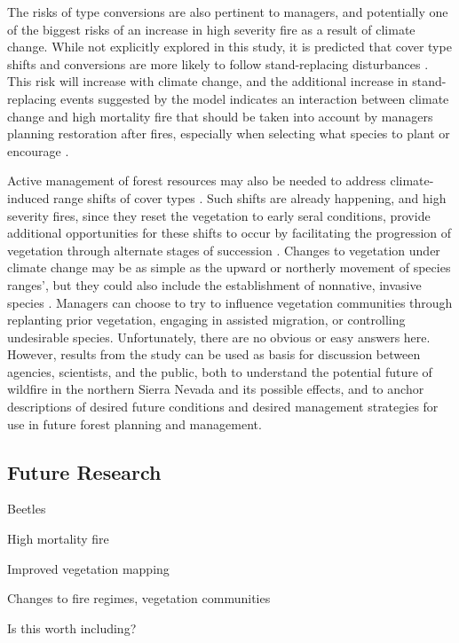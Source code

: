 The risks of type conversions are also pertinent to managers, and potentially one of the biggest risks of an increase in high severity fire as a result of climate change. While not explicitly explored in this study, it is predicted that cover type shifts and conversions are more likely to follow stand-replacing disturbances \citep{Stephens2013}. This risk will increase with climate change, and the additional increase in stand-replacing events suggested by the model indicates an interaction between climate change and high mortality fire that should be taken into account by managers planning restoration after fires, especially when selecting what species to plant or encourage \citep{Fule2008,Schwartz2015}. 

Active management of forest resources may also be needed to address climate-induced range shifts of cover types \citep{Keane2009}. Such shifts are already happening, and high severity fires, since they reset the vegetation to early seral conditions, provide additional opportunities for these shifts to occur by facilitating the progression of vegetation through alternate stages of succession \citep{Bachelet2001}. Changes to vegetation under climate change may be as simple as the upward or northerly movement of species ranges’, but they could also include the establishment of nonnative, invasive species \citep{McKenzie2004}. Managers can choose to try to influence vegetation communities through replanting prior vegetation, engaging in assisted migration, or controlling undesirable species. 
Unfortunately, there are no obvious or easy answers here. However, results from the study can be used as basis for discussion between agencies, scientists, and the public, both to understand the potential future of wildfire in the northern Sierra Nevada and its possible effects, and to anchor descriptions of desired future conditions and desired management strategies for use in future forest planning and management.


\subsection*{Future Research}

Beetles

High mortality fire %

Improved vegetation mapping

Changes to fire regimes, vegetation communities

Is this worth including?




